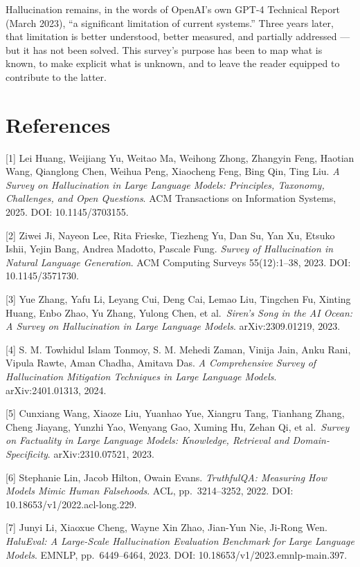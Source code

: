 Hallucination remains, in the words of OpenAI's own GPT-4 Technical Report (March 2023), ``a significant limitation of current systems.'' Three years later, that limitation is better understood, better measured, and partially addressed --- but it has not been solved. This survey's purpose has been to map what is known, to make explicit what is unknown, and to leave the reader equipped to contribute to the latter.

\section{References}\label{references}

{[}1{]} Lei Huang, Weijiang Yu, Weitao Ma, Weihong Zhong, Zhangyin Feng, Haotian Wang, Qianglong Chen, Weihua Peng, Xiaocheng Feng, Bing Qin, Ting Liu. \emph{A Survey on Hallucination in Large Language Models: Principles, Taxonomy, Challenges, and Open Questions}. ACM Transactions on Information Systems, 2025. DOI: 10.1145/3703155.

{[}2{]} Ziwei Ji, Nayeon Lee, Rita Frieske, Tiezheng Yu, Dan Su, Yan Xu, Etsuko Ishii, Yejin Bang, Andrea Madotto, Pascale Fung. \emph{Survey of Hallucination in Natural Language Generation}. ACM Computing Surveys 55(12):1--38, 2023. DOI: 10.1145/3571730.

{[}3{]} Yue Zhang, Yafu Li, Leyang Cui, Deng Cai, Lemao Liu, Tingchen Fu, Xinting Huang, Enbo Zhao, Yu Zhang, Yulong Chen, et al.~\emph{Siren's Song in the AI Ocean: A Survey on Hallucination in Large Language Models}. arXiv:2309.01219, 2023.

{[}4{]} S. M. Towhidul Islam Tonmoy, S. M. Mehedi Zaman, Vinija Jain, Anku Rani, Vipula Rawte, Aman Chadha, Amitava Das. \emph{A Comprehensive Survey of Hallucination Mitigation Techniques in Large Language Models}. arXiv:2401.01313, 2024.

{[}5{]} Cunxiang Wang, Xiaoze Liu, Yuanhao Yue, Xiangru Tang, Tianhang Zhang, Cheng Jiayang, Yunzhi Yao, Wenyang Gao, Xuming Hu, Zehan Qi, et al.~\emph{Survey on Factuality in Large Language Models: Knowledge, Retrieval and Domain-Specificity}. arXiv:2310.07521, 2023.

{[}6{]} Stephanie Lin, Jacob Hilton, Owain Evans. \emph{TruthfulQA: Measuring How Models Mimic Human Falsehoods}. ACL, pp.~3214--3252, 2022. DOI: 10.18653/v1/2022.acl-long.229.

{[}7{]} Junyi Li, Xiaoxue Cheng, Wayne Xin Zhao, Jian-Yun Nie, Ji-Rong Wen. \emph{HaluEval: A Large-Scale Hallucination Evaluation Benchmark for Large Language Models}. EMNLP, pp.~6449--6464, 2023. DOI: 10.18653/v1/2023.emnlp-main.397.

